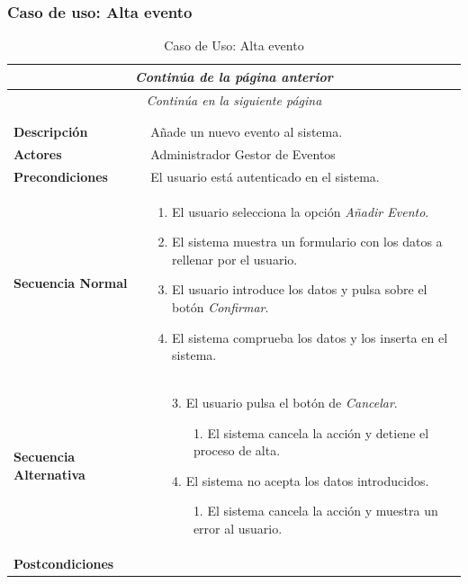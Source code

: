 \subsubsection*{Caso de uso: Alta evento }
\begin{longtable}{| p{4cm} | p{10cm} |}
\endfirsthead
\multicolumn{2}{c}{\textit{Continúa de la página anterior}}\\[12pt]
\hline
\endhead
\hline
\multicolumn{2}{c}{\textit{Continúa en la siguiente página}} \\
\endfoot
\hline
\caption{Caso de Uso: Alta evento}\label{fig:1}\\
\endlastfoot


\hline
\multicolumn{2}{|c|}{\textbf{CU$<$38$>$ - Alta Evento}} \\

\hline
\textbf{Descripción} &
Añade un nuevo evento al sistema.\\

\hline
\textbf{Actores} &
Administrador\newline
Gestor de Eventos\\

\hline
\textbf{Precondiciones} &
El usuario está autenticado en el sistema.\\

\hline
\textbf{Secuencia Normal} &\mbox{}\par\vspace{-\baselineskip}
\begin{enumerate}[leftmargin=0.7cm, topsep=0.1cm]
\item El usuario selecciona la opción \textit{Añadir Evento}.
\item El sistema muestra un formulario con los datos a rellenar por el usuario.
\item El usuario introduce los datos y pulsa sobre el botón \textit{Confirmar}.
\item El sistema comprueba los datos y los inserta en el sistema.
\end{enumerate}


\\
\hline
\textbf{Secuencia Alternativa} &\mbox{}\par\vspace{-\baselineskip}
\begin{enumerate}[leftmargin=0.9cm, topsep=0.1cm]
\item[3.] El usuario pulsa el botón de \textit{Cancelar}.
	\begin{itemize}
	\item[1.] El sistema cancela la acción y detiene el proceso de alta.
	\end{itemize}
\item[4.] El sistema no acepta los datos introducidos.
	\begin{itemize}
	\item[1.] El sistema cancela la acción y muestra un error al usuario.
	\end{itemize}
\end{enumerate}
\\

\hline
\textbf{Postcondiciones} & \\
\hline
\end{longtable}
